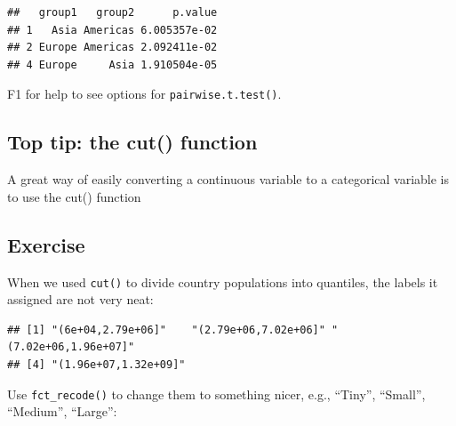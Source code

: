 \documentclass[]{book}
\makeatletter
\newenvironment{Shaded}{\begin{snugshade}}{\end{snugshade}}
\newcommand{\KeywordTok}[1]{\textcolor[rgb]{0.13,0.29,0.53}{\textbf{#1}}}
\newcommand{\DataTypeTok}[1]{\textcolor[rgb]{0.13,0.29,0.53}{#1}}
\newcommand{\StringTok}[1]{\textcolor[rgb]{0.31,0.60,0.02}{#1}}
\newcommand{\OperatorTok}[1]{\textcolor[rgb]{0.81,0.36,0.00}{\textbf{#1}}}
\newcommand{\NormalTok}[1]{#1}
\newenvironment{kframe}{%
\medskip{}
\setlength{\fboxsep}{.8em}
 \def\at@end@of@kframe{}%
 \ifinner\ifhmode%
  \def\at@end@of@kframe{\end{minipage}}%
  \begin{minipage}{\columnwidth}%
 \fi\fi%
 \def\FrameCommand##1{\hskip\@totalleftmargin \hskip-\fboxsep
 \colorbox{shadecolor}{##1}\hskip-\fboxsep
     \hskip-\linewidth \hskip-\@totalleftmargin \hskip\columnwidth}%
 \MakeFramed {\advance\hsize-\width
   \@totalleftmargin\z@ \linewidth\hsize
   \@setminipage}}%
 {\par\unskip\endMakeFramed%
 \at@end@of@kframe}
\renewenvironment{Shaded}{\begin{kframe}}{\end{kframe}}
\makeatother
\begin{document}
\begin{verbatim}
##   group1   group2      p.value
## 1   Asia Americas 6.005357e-02
## 2 Europe Americas 2.092411e-02
## 4 Europe     Asia 1.910504e-05
\end{verbatim}

F1 for help to see options for \texttt{pairwise.t.test()}.

\subsection{Top tip: the cut() function}\label{top-tip-the-cut-function}

A great way of easily converting a continuous variable to a categorical
variable is to use the cut() function

\begin{Shaded}
\end{Shaded}

\subsection{Exercise}\label{exercise-33}

When we used \texttt{cut()} to divide country populations into
quantiles, the labels it assigned are not very neat:

\begin{Shaded}
\end{Shaded}

\begin{verbatim}
## [1] "(6e+04,2.79e+06]"    "(2.79e+06,7.02e+06]" "(7.02e+06,1.96e+07]"
## [4] "(1.96e+07,1.32e+09]"
\end{verbatim}

Use \texttt{fct\_recode()} to change them to something nicer, e.g.,
``Tiny'', ``Small'', ``Medium'', ``Large'':
\end{document}
